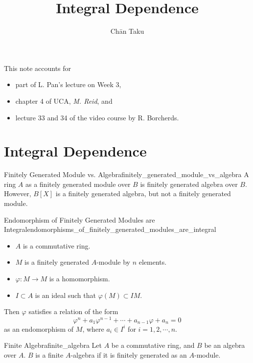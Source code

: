\documentclass{article}
\title{Integral Dependence}
\author{Ch\=an Taku}
\begin{document}
\maketitle

This note accounts for
\begin{itemize}
    \item part of L. Pan's lecture on Week 3,
    \item chapter 4 of UCA, \textit{M. Reid}, and
    \item lecture 33 and 34 of the video course by R. Borcherds.
\end{itemize}

\section{Integral Dependence}

\begin{counterexample}{Finitely Generated Module vs. Algebra}{finitely_generated_module_vs_algebra}
    A ring $A$ as a finitely generated module over $B$ is finitely generated algebra over $B$.
    However, $B[X]$ is a finitely generated algebra, but not a finitely generated module.
\end{counterexample}

\begin{theorem}{Endomorphism of Finitely Generated Modules are Integral}{endomorphisms_of_finitely_generated_modules_are_integral}
    \begin{itemize}
        \item $A$ is a commutative ring.
        \item $M$ is a finitely generated $A$-module by $n$ elements.
        \item $\varphi:M\rightarrow M$ is a homomorphism.
        \item $I\subset A$ is an ideal such that $\varphi(M) \subset IM$.
    \end{itemize}
    Then $\varphi$ satisfies a relation of the form
    \[ \varphi^n + a_1 \varphi^{n-1} + \cdots + a_{n-1} \varphi + a_n = 0 \]
    as an endomorphism of $M$,
    where $a_i \in I^i$ for $i=1,2,\cdots,n$.
\end{theorem}

\begin{definition}{Finite Algebra}{finite_algebra}
    Let $A$ be a commutative ring, and $B$ be an algebra over $A$.
    $B$ is a finite $A$-algebra if it is finitely generated as an $A$-module.
\end{definition}
\end{document}
